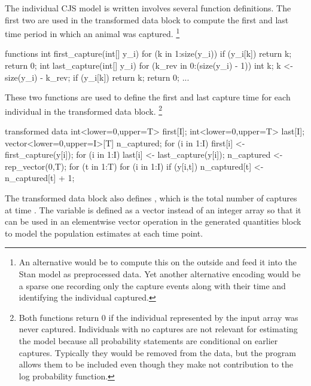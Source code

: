 The individual CJS model is written involves several function
definitions.  The first two are used in the transformed data block to
compute the first and last time period in which an animal was
captured.%
%
\footnote{An alternative would be to compute this on the outside and
feed it into the Stan model as preprocessed data.  Yet another
alternative encoding would be a sparse one recording only the
capture events along with their time and identifying the individual
captured.} 
%
\begin{stancode}
functions {
  int first_capture(int[] y_i) {
    for (k in 1:size(y_i))
      if (y_i[k])
        return k;
    return 0;
  }
  int last_capture(int[] y_i) { 
    for (k_rev in 0:(size(y_i) - 1)) {
      int k;
      k <- size(y_i) - k_rev;
      if (y_i[k]) 
        return k;
    }
    return 0;
  }
  ...
}
\end{stancode}
%
These two functions are used to define the first and last capture time
for each individual in the transformed data block.%
%
\footnote{Both functions return 0 if the individual represented by the
  input array was never captured.  Individuals with no captures are
  not relevant for estimating the model because all probability
  statements are conditional on earlier captures.  Typically they
  would be removed from the data, but the program allows them to be
  included even though they make not contribution to the log
  probability function.}
%
\begin{stancode}
transformed data {
  int<lower=0,upper=T> first[I];
  int<lower=0,upper=T> last[I];
  vector<lower=0,upper=I>[T] n_captured;
  for (i in 1:I)
    first[i] <- first_capture(y[i]);
  for (i in 1:I)
    last[i] <- last_capture(y[i]);
  n_captured <- rep_vector(0,T);
  for (t in 1:T)
    for (i in 1:I)
      if (y[i,t]) 
        n_captured[t] <- n_captured[t] + 1;
}
\end{stancode}
%
The transformed data block also defines , which is
the total number of captures at time .  The variable
 is defined as a vector instead of an integer array
so that it can be used in an elementwise vector operation in the generated
quantities block to model the population estimates at each time point.

